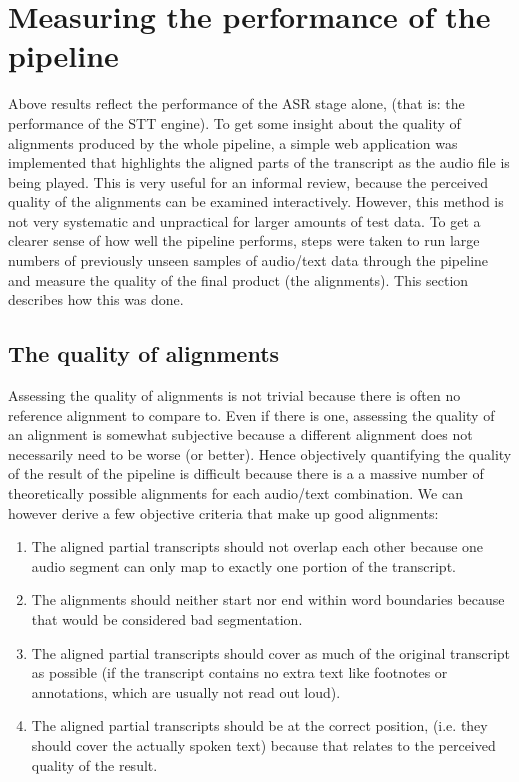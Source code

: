\section{Measuring the performance of the pipeline}\label{e2e}

Above results reflect the performance of the \ac{ASR} stage alone, (that is: the performance of the \ac{STT} engine). To get some insight about the quality of alignments produced by the whole pipeline, a simple web application was implemented that highlights the aligned parts of the transcript as the audio file is being played. This is very useful for an informal review, because the perceived quality of the alignments can be examined interactively. However, this method is not very systematic and unpractical for larger amounts of test data. To get a clearer sense of how well the pipeline performs, steps were taken to run large numbers of previously unseen samples of audio/text data through the pipeline and measure the quality of the final product (the alignments). This section describes how this was done.

\subsection{The quality of alignments}

Assessing the quality of alignments is not trivial because there is often no reference alignment to compare to. Even if there is one, assessing the quality of an alignment is somewhat subjective because a different alignment does not necessarily need to be worse (or better). Hence objectively quantifying the quality of the result of the pipeline is difficult because there is a a massive number of theoretically possible alignments for each audio/text combination. We can however derive a few objective criteria that make up good alignments:

\begin{enumerate}
	\item The aligned partial transcripts should not overlap each other because one audio segment can only map to exactly one portion of the transcript.
	\item The alignments should neither start nor end within word boundaries because that would be considered bad segmentation.
	\item The aligned partial transcripts should cover as much of the original transcript as possible (if the transcript contains no extra text like footnotes or annotations, which are usually not read out loud).
	\item The aligned partial transcripts should be at the correct position, (i.e. they should cover the actually spoken text) because that relates to the perceived quality of the result.
\end{enumerate}

